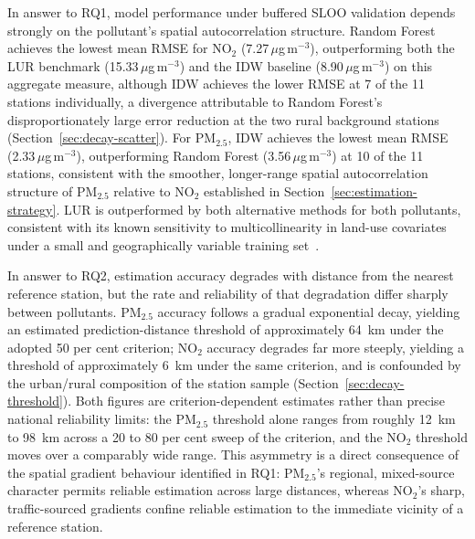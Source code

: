 \documentclass[11pt,a4paper]{article}
\begin{document}
In answer to RQ1, model performance under buffered SLOO validation depends strongly on the pollutant's spatial autocorrelation structure. Random Forest achieves the lowest mean RMSE for NO$_2$ (7.27\,$\mu$g\,m$^{-3}$), outperforming both the LUR benchmark (15.33\,$\mu$g\,m$^{-3}$) and the IDW baseline (8.90\,$\mu$g\,m$^{-3}$) on this aggregate measure, although IDW achieves the lower RMSE at 7 of the 11 stations individually, a divergence attributable to Random Forest's disproportionately large error reduction at the two rural background stations (Section~\ref{sec:decay-scatter}). For PM$_{2.5}$, IDW achieves the lowest mean RMSE (2.33\,$\mu$g\,m$^{-3}$), outperforming Random Forest (3.56\,$\mu$g\,m$^{-3}$) at 10 of the 11 stations, consistent with the smoother, longer-range spatial autocorrelation structure of PM$_{2.5}$ relative to NO$_2$ established in Section~\ref{sec:estimation-strategy}. LUR is outperformed by both alternative methods for both pollutants, consistent with its known sensitivity to multicollinearity in land-use covariates under a small and geographically variable training set~\cite{hoek_lur_review_2008}.

In answer to RQ2, estimation accuracy degrades with distance from the nearest reference station, but the rate and reliability of that degradation differ sharply between pollutants. PM$_{2.5}$ accuracy follows a gradual exponential decay, yielding an estimated prediction-distance threshold of approximately 64~km under the adopted 50 per cent criterion; NO$_2$ accuracy degrades far more steeply, yielding a threshold of approximately 6~km under the same criterion, and is confounded by the urban/rural composition of the station sample (Section~\ref{sec:decay-threshold}). Both figures are criterion-dependent estimates rather than precise national reliability limits: the PM$_{2.5}$ threshold alone ranges from roughly 12~km to 98~km across a 20 to 80 per cent sweep of the criterion, and the NO$_2$ threshold moves over a comparably wide range. This asymmetry is a direct consequence of the spatial gradient behaviour identified in RQ1: PM$_{2.5}$'s regional, mixed-source character permits reliable estimation across large distances, whereas NO$_2$'s sharp, traffic-sourced gradients confine reliable estimation to the immediate vicinity of a reference station.
\end{document}
